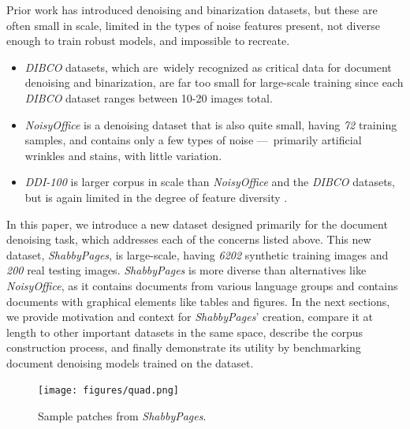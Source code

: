 \documentclass[runningheads]{llncs}
\begin{document}
Prior work has introduced denoising and binarization datasets, but these are often small in scale, limited in the types of noise features present, not diverse enough to train robust models, and impossible to recreate.
\begin{itemize}
\item \emph{DIBCO} datasets, which are widely recognized as critical data for document denoising and binarization, are far too small for large-scale training since each \emph{DIBCO} dataset ranges between 10-20 images total.
\item \emph{NoisyOffice} \cite{ref_NoisyOfficeDatabase} is a denoising dataset that is also quite small, having \emph{72} training samples, and contains only a few types of noise — primarily artificial wrinkles and stains, with little variation.
\item \emph{DDI-100} \cite{ddi-100-2019} is larger corpus in scale than \emph{NoisyOffice} and the \emph{DIBCO} datasets, but is again limited in the degree of feature diversity \cite{detection-masking-2022}.
\end{itemize}

In this paper, we introduce a new dataset designed primarily for the document denoising task, which addresses each of the concerns listed above.
This new dataset, \emph{ShabbyPages}, is large-scale, having \emph{6202} synthetic training images and \emph{200} real testing images.
\emph{ShabbyPages} is more diverse than alternatives like \emph{NoisyOffice}, as it contains documents from various language groups and contains documents with graphical elements like tables and figures.
In the next sections, we provide motivation and context for \emph{ShabbyPages}' creation, compare it at length to other important datasets in the same space, describe the corpus construction process, and finally demonstrate its utility by benchmarking document denoising models trained on the dataset.

\begin{figure}
\centering
\texttt{[image: figures/quad.png]}
\caption{Sample patches from \emph{ShabbyPages}.} \label{fig1}
\end{figure}
\end{document}
